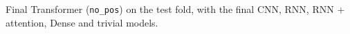 \begin{table}[htbp]
\centering
\caption[Transformer: final model (test)]{Final Transformer (\texttt{no\_pos}) on the test fold, with the final CNN, RNN, RNN + attention, Dense and trivial models.}
\label{tab:transformer_final}
\small
\begin{adjustbox}{max width=\textwidth}

\end{adjustbox}
\end{table}
